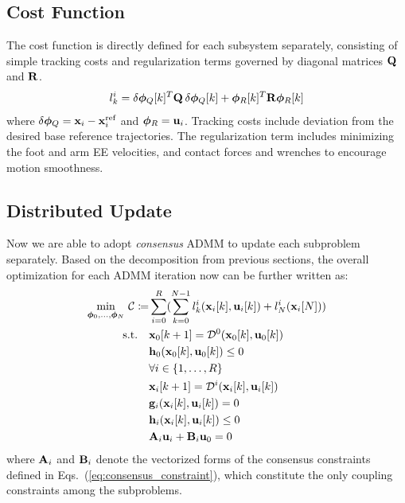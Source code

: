 \subsection{Cost Function}
The cost function is directly defined for each subsystem separately, consisting of simple tracking costs and regularization terms governed by diagonal matrices $\mathbf{Q}$ and $\mathbf{R}$. 
\begin{equation}
    l_k^{i} = \delta \bm{\phi}_Q[k]^T\mathbf{Q}\hspace{2pt}\delta \bm{\phi}_Q[k] + \bm{\phi}_R[k]^{T}\mathbf{R}\bm{\phi}_R[k]
\end{equation}
where $\delta \bm{\phi}_Q = \mathbf{x}_i - \mathbf{x}_i^{\text{ref}}$ and $\bm{\phi}_R = \mathbf{u}_i$.
Tracking costs include deviation from the desired base reference trajectories. The regularization term includes minimizing the foot and arm EE velocities, and contact forces and wrenches to encourage motion smoothness. 

\subsection{Distributed Update}
Now we are able to adopt \textit{consensus} ADMM to update each subproblem separately. Based on the decomposition from previous sections, the overall optimization for each ADMM iteration now can be further written as:
\begin{subequations} 
\begin{align}
	\underset{\bm{\phi}_0,\dots,\bm{\phi}_N}{\text{min}} \ \mathcal{C} \coloneqq & \sum_{i = 0}^{R}(\sum_{k = 0}^{N-1}l_k^i(\mathbf{x}_{i}[k], \mathbf{u}_{i}[k]) + l_N^i(\mathbf{x}_{i}[N])) \\\label{eq:payload_dynamics}
	\text{s.t.} \quad & \mathbf{x}_{0}[k+1] = \mathcal{D}^0(\mathbf{x}_{0}[k], \mathbf{u}_{0}[k]) \\\label{eq:payload_constraint}
    & \mathbf{h}_0(\mathbf{x}_{0}[k], \mathbf{u}_{0}[k]) \leq 0\\
    & \forall i \in \{1, \dots, R\} \nonumber\\\label{eq:robot_dynamics}
    & \mathbf{x}_{i}[k+1] = \mathcal{D}^i(\mathbf{x}_{i}[k], \mathbf{u}_{i}[k]) \\\label{eq:robot_eq_constraint}
    & \mathbf{g}_i(\mathbf{x}_{i}[k], \mathbf{u}_{i}[k]) = 0 \\
    \label{eq:robot_ineq_constraint}
    & \mathbf{h}_i(\mathbf{x}_{i}[k], \mathbf{u}_{i}[k]) \leq 0 \\
    \label{eq:consensus_constraint_vecterized}
    & \mathbf{A}_i \mathbf{u}_i + \mathbf{B}_i \mathbf{u}_0 = 0
\end{align}
\end{subequations}
where $\mathbf{A}_i$ and $\mathbf{B}_i$ denote the vectorized forms of the consensus constraints defined in Eqs.~(\ref{eq:consensus_constraint}), which constitute the only coupling constraints among the subproblems.

